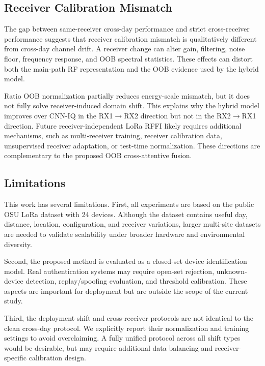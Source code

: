 \subsection{Receiver Calibration Mismatch}

The gap between same-receiver cross-day performance and strict cross-receiver performance suggests that receiver calibration mismatch is qualitatively different from cross-day channel drift. A receiver change can alter gain, filtering, noise floor, frequency response, and OOB spectral statistics. These effects can distort both the main-path RF representation and the OOB evidence used by the hybrid model.

Ratio OOB normalization partially reduces energy-scale mismatch, but it does not fully solve receiver-induced domain shift. This explains why the hybrid model improves over CNN-IQ in the RX1$\rightarrow$RX2 direction but not in the RX2$\rightarrow$RX1 direction. Future receiver-independent LoRa RFFI likely requires additional mechanisms, such as multi-receiver training, receiver calibration data, unsupervised receiver adaptation, or test-time normalization. These directions are complementary to the proposed OOB cross-attentive fusion.

\subsection{Limitations}

This work has several limitations. First, all experiments are based on the public OSU LoRa dataset with 24 devices. Although the dataset contains useful day, distance, location, configuration, and receiver variations, larger multi-site datasets are needed to validate scalability under broader hardware and environmental diversity.

Second, the proposed method is evaluated as a closed-set device identification model. Real authentication systems may require open-set rejection, unknown-device detection, replay/spoofing evaluation, and threshold calibration. These aspects are important for deployment but are outside the scope of the current study.

Third, the deployment-shift and cross-receiver protocols are not identical to the clean cross-day protocol. We explicitly report their normalization and training settings to avoid overclaiming. A fully unified protocol across all shift types would be desirable, but may require additional data balancing and receiver-specific calibration design.

